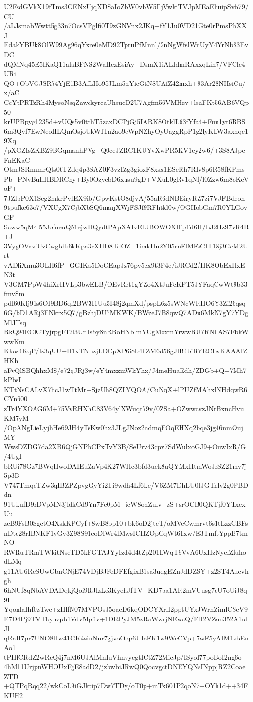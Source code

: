 U2FsdGVkX19fTms3OENxUjqXDSaIoZbW0vbW5IljVwkiTVJpMEaEhuipSvb79/CU
/aLJsmabWwtt5g33n7OcsVPglfi0T9zGNVnx2JKq+fY1Ju0VD21Gte0rPmsPhXXJ
EdakYBUk8OlW99Ag96qYxre0eMD92TpruPfMnnl/2nNgWfslWuUyY4YrNb83EvDC
dQMNq45E5fKaQ11alaBFNS2WaHczEsiAy+DsmX1iALIdmRAxxqLih7/VFClc4URi
QO+ObVGJSR74YjE1B3AfLHo95JLm5nYicGtN8UAfZ42mxh+93Ar28NHsiCu/x/aC
CcYtPRTzRh4MysoNsqZawckyreaUhsucD2U7Agfm56VMHzv+lsnFKt56AB6VQp50
krUPBpyg1235d+vUQs5v0trhT5zaxDCPjGj5IARK8OtklL63fYfa4+Fun1yt6BBS
6m3Qvf7EwNeoHLQmOsjoUkWITn2ao9cWpNZhyOyUaggRpP1g2lyKLW3axnqc19Xq
/pXGZIsZKBZ9BGqmanhPVg+Q0ceJZRC1KUYvXwPR5KV1ey2w6/+3S8AJpeFnEKaC
OtmJSRnnmrQts0tTZdq4p3SAZ0F3vzIZg3gioxF8xsx1ESeRh7RIv8p6R58fKPms
Pb+PNvBuIlHBDRChy+By0OzyebD6xusu9gD+VXuL0gRv1qNf/l0Zzw6m8oKeVoF+
7JZlbP0X1Seg2mkrPvIEX9ib/GpwKstO8djvA/55aR6dNBEiryRZ7zi7VJFBdeoh
9tpufke63o7/VXUgX7CjbXbSQ6maijXWjFSJf9RFhtkl0w/OGHobGm7R0YLGovGF
Scww5qM4l55JofneuQ51ejwHQydtPApXAIvElUBOWOXIFpFd6H/LJ2Hz97vR4R+J
3VygOVaviUzCwgIdk6kKpa3rXHD8TdOZ+1imkHu2Y05rnFlMFsCIT18j3GeM2Urt
vADliXmu3OLH6fP+GGIKa5DoOEapJz76pv5cx9t3F4e/iJRCd2/HK8ObExHxEN3t
V3GM7PpW4hiXrHVLp3bwELB/OEvRet1gYZo4XtJuFcKPT5JYFaqCwWt9b33fmvSm
pdl60Klj91s6OI9BD6qI2BW3I1Uu5I48j2qmXd/pspL6z5sWNcWRHO6Y3Zi26qsq
6G/bD1ARj3FNkrx5Q7/gBzhjDU7MKWK/BWzeJ7B8qwQ7ADu6MkN7gY7YDgMlJTsq
RkQ94EClCTyjrpgF12l3UrTs5y8nRBoHNblmYCgMoxmYrwwRU7RNFAS7FbkWwwKm
Kkos4KqP/Is3qUU+H1xTNLzjLDCpXP6i8b4hZM6d56gJlB4biRYRCLvKAAAIZHKh
aFvQlSBQhhxMS/e72qJRj3w/eY4mxzmWkYhx/J4meHuaEdh/ZDGb+Q+7Mh7kPbsI
KTtNsCALvX7bcJ1wTtMr+SjzUh8QZLYQOA/CuNqX+lPUZfMAhxlNHdqwR6CYn600
zTr4YXOAG6M+75VvRHXhC83V64ylXWuqt79v/0ZSa+OZwwcvzJNrBxncHvuKM7yM
/OpANgLieLyjhHe69JH4yTsKw0hx3JLgJNoz2ndmqFOqEHXq2bqe3jg46nmOujMY
WwsDZDG7da2XB6QjGNPbCPxTvY3B/SeUrv43cpv7SdWulxoGJ9+OuwIxR/G/4UgI
bRUi78Gz7BWqHwoDAIEuZaVp4K27WHc3bfd3uek8uQYMxHtmWoJrSZ21mv7j5p3B
V747TmqeTZw3qIBZPZpvgGyYi2Ti9wdh4Lf6Le/V6ZM7DhLU0IJGTnlv2g0PBDdn
91UkufD9rDVpMN3jldkCd9Yn7Fc0pM+icW8ohZulv+zS+srOCB0QKTjf0YTxexUu
zeB9FsB0SgctO4XskKPCyf+8wB8bp10+bk6oD2jtcT/oMVeCwmrvt6s1tLzzGBFs
nDtc28rIBNKF1yGv3Z98S91coDlWr4lMwsICHZOpCqWt61xw/E3TmftYppB7tmNO
RWRuTRmTWkitNseTD5kFGTAJYyIzd4d4tZp201LWqT9VvA6UxHzNyclZfuhodLMq
g11AU6ReSUwObnCNjE74VDjBJFeDFEfgixB1sa3udgEZnJdDZSY+z2ST4Auevhgh
6hNUf8qNbAVDADqkjQoi9RJlzLe3KyehJfTV+KD7ba1AR2mVUusg7cU7oUiJ8q9I
YqonlaIhf0zTwe+zHlfN07MVPOsJ5oaeD6kqODCYXrlI2pptUYxJWrnZimlCScV9
E7D4Pj9TVTbynzpb1Vdv5Ipfiv+1DRPyJM5zRaWwrjNEwcQ/FH2VZon352A1uIJl
qRaH7pr7UNO8Hw41GK4siuNnr7gjvoOop6UIoFK1w9WcCVp+7wF5yAIM1zbEnAo1
tPHfCRdZ2wRcQ4j7nM6UJAlMnIuVhnvycgtICtZ72MicJp/ISyoI77poBoI2ng6o
4hM11UrjpnWHOUxFgE8adD2/jzbwbiJRwQ0QocvgctDNEYQNsINppjRZ2CoaeZTD
+QTPqRqq22/wkCoL9iGJktip7Dw7TDy/oT0p+mTx601P2qoN7+OYh1d++34FKUH2
